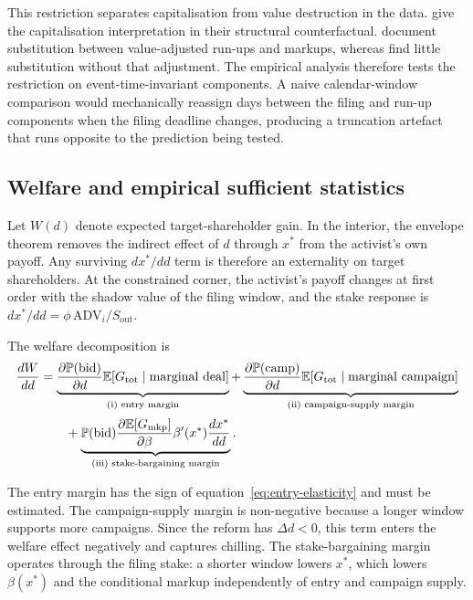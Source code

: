 This restriction separates capitalisation from value destruction in the data.
\textcite{celentanolevine2025} give the capitalisation interpretation in their
structural counterfactual. \textcite{bett2014} document substitution between
value-adjusted run-ups and markups, whereas \textcite{schwert1996} find little
substitution without that adjustment. The empirical analysis therefore tests
the restriction on event-time-invariant components. A naive calendar-window
comparison would mechanically reassign days between the filing and run-up
components when the filing deadline changes, producing a truncation artefact
that runs opposite to the prediction being tested.

\subsection{Welfare and empirical sufficient statistics}
\label{sec:model-policy}

Let $W(d)$ denote expected target-shareholder gain. In the interior, the
envelope theorem removes the indirect effect of $d$ through $x^\ast$ from the
activist's own payoff. Any surviving $dx^\ast/dd$ term is therefore an
externality on target shareholders. At the constrained corner, the activist's
payoff changes at first order with the shadow value of the filing window, and
the stake response is
$dx^\ast/dd=\phi\,\mathrm{ADV}_i/S_{\mathrm{out}}$.

The welfare decomposition is
\begin{equation}
\begin{split}
\frac{dW}{dd}
&=\underbrace{\frac{\partial\mathbb{P}(\mathrm{bid})}{\partial d}
   \mathbb{E}\!\left[G_{\mathrm{tot}}\mid\text{marginal deal}\right]}
   _{\text{(i) entry margin}}
+\underbrace{\frac{\partial\mathbb{P}(\mathrm{camp})}{\partial d}
   \mathbb{E}\!\left[G_{\mathrm{tot}}\mid\text{marginal campaign}\right]}
   _{\text{(ii) campaign-supply margin}}\\[2pt]
&\qquad
+\underbrace{\mathbb{P}(\mathrm{bid})
   \frac{\partial\mathbb{E}[G_{\mathrm{mkp}}]}{\partial\beta}
   \beta'(x^\ast)\frac{dx^\ast}{dd}}
   _{\text{(iii) stake-bargaining margin}}.
\end{split}
\label{eq:welfare}
\end{equation}

The entry margin has the sign of equation~\eqref{eq:entry-elasticity} and must
be estimated. The campaign-supply margin is non-negative because a longer
window supports more campaigns. Since the reform has $\Delta d<0$, this term
enters the welfare effect negatively and captures chilling. The
stake-bargaining margin operates through the filing stake: a shorter window
lowers $x^\ast$, which lowers $\beta(x^\ast)$ and the conditional markup
independently of entry and campaign supply.


